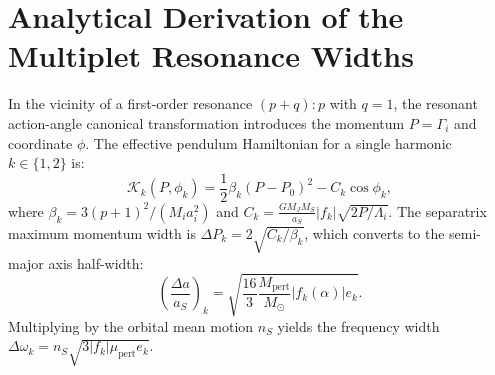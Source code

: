 \documentclass[11pt,a4paper]{article}
\begin{document}
\appendix
\section{Analytical Derivation of the Multiplet Resonance Widths}
In the vicinity of a first-order resonance $(p+q):p$ with $q=1$, the resonant action-angle canonical transformation introduces the momentum $P = \Gamma_i$ and coordinate $\phi$. The effective pendulum Hamiltonian for a single harmonic $k \in \{1, 2\}$ is:
\begin{equation}
\mathcal{K}_k(P, \phi_k) = \frac{1}{2} \beta_k (P - P_0)^2 - C_k \cos \phi_k,
\end{equation}
where $\beta_k = 3 (p+1)^2 / (M_i a_i^2)$ and $C_k = \frac{G M_J M_S}{a_S} |f_k| \sqrt{2 P / \Lambda_i}$.
The separatrix maximum momentum width is $\Delta P_k = 2 \sqrt{C_k / \beta_k}$, which converts to the semi-major axis half-width:
\begin{equation}
\left(\frac{\Delta a}{a_S}\right)_k = \sqrt{\frac{16}{3} \frac{M_{\text{pert}}}{M_\odot} |f_k(\alpha)| e_k}.
\end{equation}
Multiplying by the orbital mean motion $n_S$ yields the frequency width $\Delta \omega_k = n_S \sqrt{3 |f_k| \mu_{\text{pert}} e_k}$.
\end{document}
